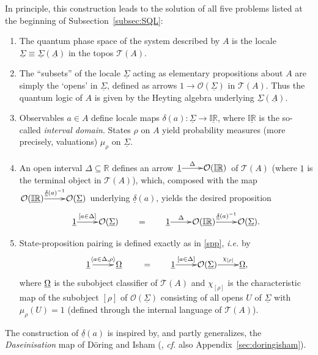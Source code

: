 \documentclass[11pt]{article}
\newcommand{\inv}{^{-1}}
\newcommand{\er}{\eqref}
\newcommand{\dl}{\delta} \newcommand{\Dl}{\Delta}
\newcommand{\CO}{{\mathcal O}} \newcommand{\CP}{{\mathcal P}}
\newcommand{\alg}[1]{\ensuremath{#1}}
\newcommand{\functor}[1]{\ensuremath{\underline{#1}}}
\newcommand{\asstopos}{\ensuremath{\mathcal{T}}}
\newcommand{\field}[1]{\ensuremath{\mathbb{#1}}}
\newcommand{\uS}{\underline{\Sigma}}
\newcommand{\uA}{\underline{A}}
\newcommand{\TA}{\mathcal{T}(A)}
\newcommand{\ie}{\textit{i.e.}}
\newcommand{\ulS}{\functor{\Sigma}}
\renewcommand{\TA}{\asstopos(\alg{A})}
\begin{document}
In principle, this construction leads to the solution of all five problems
listed at the beginning of Subsection~\ref{subsec:SQL}:
\begin{enumerate}
\item  The quantum phase space of the system described by $A$ is the
  locale $\ulS\equiv\ulS(\uA)$ in the topos $\TA$.
\item The  ``subsets'' of the locale $\ulS$  acting as elementary
  propositions about $A$ are simply the `opens' in $\ulS$, defined as
  arrows $1\to\CO(\ulS)$ in $\TA$. Thus the quantum logic
  of $A$ is given by the Heyting algebra underlying $\ulS(\uA)$.
\item Observables $a\in A$ define locale maps $\dl(a):
  \ulS\to\underline{\mathbb{IR}}$, where $\underline{\mathbb{IR}}$ is
  the so-called {\it interval domain}. States $\rho$ on $A$ yield
  probability measures (more precisely, valuations) $\mu_{\rho}$ on
  $\ulS$.
\item An open interval $\Dl\subseteq \mathbb{R}$ defines an arrow
  $\xymatrix@1{\underline{1} \ar^-{\Delta}[r] &
  \CO(\underline{\field{IR}})}$ of $\TA$ (where $\underline{1}$ is the
  terminal object in $\TA$), which, composed with the map
  $\xymatrix@1{\CO(\underline{\mathbb{IR}}) \ar^-{\underline{\dl}(a)\inv}[r] & \CO(\ulS)}$
  underlying $\underline{\dl}(a)$, yields the desired proposition
  \[
    \xymatrix@1{\underline{1} \ar^-{[a \in \Delta]}[r] & \CO(\uS)}
    \qquad =\qquad
    \xymatrix@1{\underline{1} \ar^-{\Delta}[r] &
    \CO(\underline{\field{IR}}) \ar^-{\underline{\dl}(a)\inv}[r] & \CO(\ulS).}
  \]
\item State-proposition pairing is defined exactly as in \er{spp}, \ie
  by
  \begin{equation}
   \xymatrix{\underline{1} \ar^-{\langle a\in \Dl,\rho \rangle}[r] & \underline{\Om}}
   \qquad =\qquad
   \xymatrix@1{\underline{1} \ar^-{[a \in \Delta]}[r] & \CO(\ulS)
   \ar^-{\chi_{[\rho]}}[r] & \underline{\Om},}
   \label{sppbis}
 \end{equation}
  where $\underline{\Omega}$ is the subobject classifier of $\TA$ and
  $\chi_{[\rho]}$ is the characteristic map of the subobject $[\rho]$
  of $\CO(\ulS)$ consisting of all opens $U$ of $\ulS$ with
  $\mu_{\rho}(U)=1$ (defined  through the internal language of
  $\TA$).
\end{enumerate}
The construction of $\underline{\dl}(a)$ is inspired by, and partly generalizes,
the {\it Daseinisation} map of D\"{o}ring and Isham (\cite{doringisham2,
doringisham3}, \textit{cf.} also Appendix~\ref{sec:doringisham}).
\end{document}
